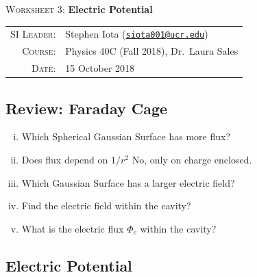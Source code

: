 \documentclass[12pt]{article}
\newcommand{\email}[1]{\texttt{\href{mailto:#1}{#1}}}
\begin{document}
\begin{center}

\Large{\textsc{Worksheet 3}: \textbf{Electric Potential}}

\end{center}

\vspace{.5mm}


\begin{tabular}{rl}
\textsc{SI Leader}:
&
Stephen Iota (\email{siota001@ucr.edu})
\\
\textsc{Course}:
&
Physics 40C (Fall 2018), Dr.~Laura Sales
\\
\textsc{Date}:
&
15 October 2018
\end{tabular}


\subsection*{Review: Faraday Cage}

\begin{enumerate}[(i)]
\item Which Spherical Gaussian Surface has more flux?
\item Does flux depend on $1/r^2$ No, only on charge enclosed.
\item Which Gaussian Surface has a larger electric field?
\item Find the electric field within the cavity?
\item What is the electric flux $\Phi_e$ within the cavity?
\end{enumerate}



\subsection*{Electric Potential}
\end{document}
